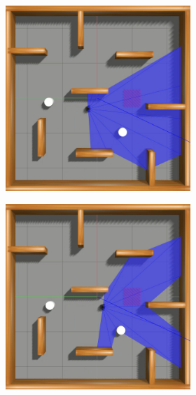 \begin{figure}[H]
\begin{center}
\begin{subfigure}[b]{0.60\textwidth}
        \begin{subfigure}[b]{0.24\textwidth}
            \includegraphics[width=\textwidth]{imagens/simulated_envs/sim_env3_sac/5.png}
        \end{subfigure}
        \hfill
        \begin{subfigure}[b]{0.24\textwidth}
            \includegraphics[width=\textwidth]{imagens/simulated_envs/sim_env3_sac/6.png}

\end{subfigure}
\end{subfigure}
\end{center}
\end{figure}
